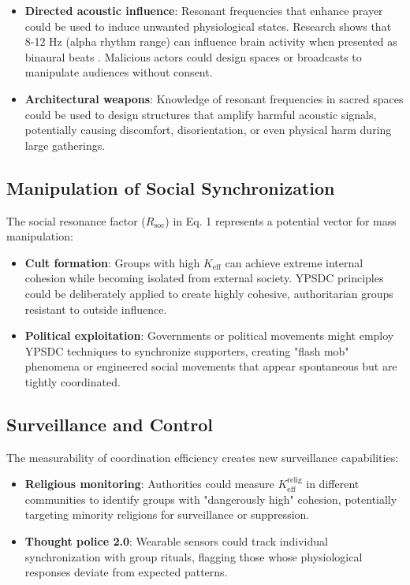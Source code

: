 \documentclass[12pt,a4paper]{article}
\begin{document}
	\begin{itemize}
		\item \textbf{Directed acoustic influence}: Resonant frequencies that enhance prayer could be used to induce unwanted physiological states. Research shows that 8-12 Hz (alpha rhythm range) can influence brain activity when presented as binaural beats \cite{Garcia2021}. Malicious actors could design spaces or broadcasts to manipulate audiences without consent.
		
		\item \textbf{Architectural weapons}: Knowledge of resonant frequencies in sacred spaces could be used to design structures that amplify harmful acoustic signals, potentially causing discomfort, disorientation, or even physical harm during large gatherings.
	\end{itemize}
	
	\subsection{Manipulation of Social Synchronization}
	
	The social resonance factor ($R_{\mathrm{soc}}$) in Eq. 1 represents a potential vector for mass manipulation:
	
	\begin{itemize}
		\item \textbf{Cult formation}: Groups with high $K_{\mathrm{eff}}$ can achieve extreme internal cohesion while becoming isolated from external society. YPSDC principles could be deliberately applied to create highly cohesive, authoritarian groups resistant to outside influence.
		
		\item \textbf{Political exploitation}: Governments or political movements might employ YPSDC techniques to synchronize supporters, creating "flash mob" phenomena or engineered social movements that appear spontaneous but are tightly coordinated.
	\end{itemize}
	
	\subsection{Surveillance and Control}
	
	The measurability of coordination efficiency creates new surveillance capabilities:
	
	\begin{itemize}
		\item \textbf{Religious monitoring}: Authorities could measure $K_{\mathrm{eff}}^{\mathrm{relig}}$ in different communities to identify groups with "dangerously high" cohesion, potentially targeting minority religions for surveillance or suppression.
		
		\item \textbf{Thought police 2.0}: Wearable sensors could track individual synchronization with group rituals, flagging those whose physiological responses deviate from expected patterns.
	\end{itemize}
	
\end{document}
